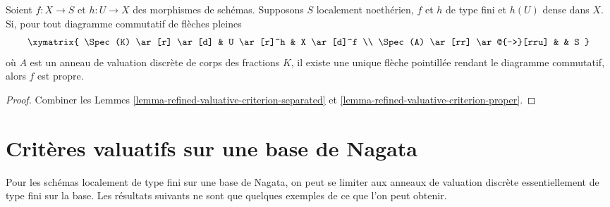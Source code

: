 \begin{lemma}
\label{lemma-refined-valuative-criterion-universally-closed}
Soient $f : X \to S$ et $h : U \to X$ des morphismes de schémas.
Supposons $S$ localement noethérien, $f$ et $h$ de type fini et
$h(U)$ dense dans $X$. Si, pour tout diagramme commutatif de flèches pleines
$$
\xymatrix{
\Spec(K) \ar[r] \ar[d] & U \ar[r]^h & X \ar[d]^f \\
\Spec(A) \ar[rr] \ar@{-->}[rru] & & S
}
$$
où $A$ est un anneau de valuation discrète de corps des fractions $K$,
il existe une unique flèche pointillée rendant le diagramme commutatif, alors $f$ est propre.
\end{lemma}

\begin{proof}
Combiner les Lemmes \ref{lemma-refined-valuative-criterion-separated} et
\ref{lemma-refined-valuative-criterion-proper}.
\end{proof}









\section{Critères valuatifs sur une base de Nagata}
\label{section-nagata-valuative}

\noindent
Pour les schémas localement de type fini sur une
base de Nagata, on peut se limiter aux anneaux de valuation discrète
essentiellement de type fini sur la base.
Les résultats suivants ne sont que quelques exemples de ce que l'on peut obtenir.

